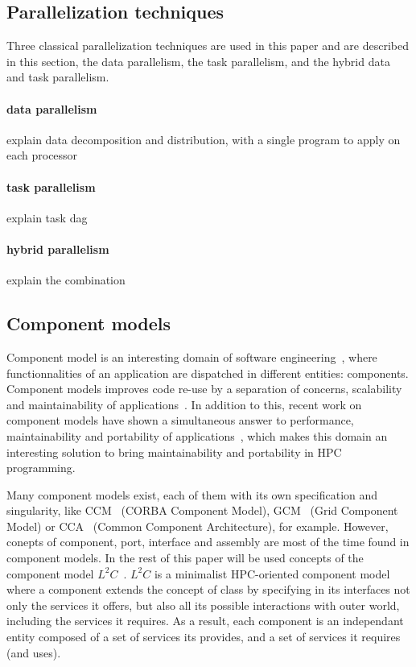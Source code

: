 \subsection{Parallelization techniques}
\label{sect:parallel}
Three classical parallelization techniques are used in this paper and are described in this section, the data parallelism, the task parallelism, and the hybrid data and task parallelism.

\paragraph{data parallelism} explain data decomposition and distribution, with a single program to apply on each processor

\paragraph{task parallelism} explain task dag

\paragraph{hybrid parallelism} explain the combination


\subsection{Component models}
Component model is an interesting domain of software engineering~\cite{Szyperski:2002:CSB:515228}, where functionnalities of an application are dispatched in different entities: components. Component models improves code re-use by a separation of concerns, scalability and maintainability of applications~\cite{Szyperski:2002:CSB:515228,bigot:inria-00388508}. In addition to this, recent work on component models have shown a simultaneous answer to performance, maintainability and portability of applications~\cite{l2c}, which makes this domain an interesting solution to bring maintainability and portability in HPC programming.

Many component models exist, each of them with its own specification and singularity, like CCM~\cite{corba:omg06} (CORBA Component Model), GCM~\cite{Baude} (Grid Component Model) or CCA~\cite{Armstrong:1999:TCC:822084.823232} (Common Component Architecture), for example. However, conepts of component, port, interface and assembly are most of the time found in component models. In the rest of this paper will be used concepts of the component model $L^2C$~\cite{l2c}. $L^2C$ is a minimalist HPC-oriented component model where a component extends the concept of class by specifying in its interfaces not only the services it offers, but also all its possible interactions with outer world, including the services it requires. As a result, each component is an independant entity composed of a set of services its provides, and a set of services it requires (and uses). 

